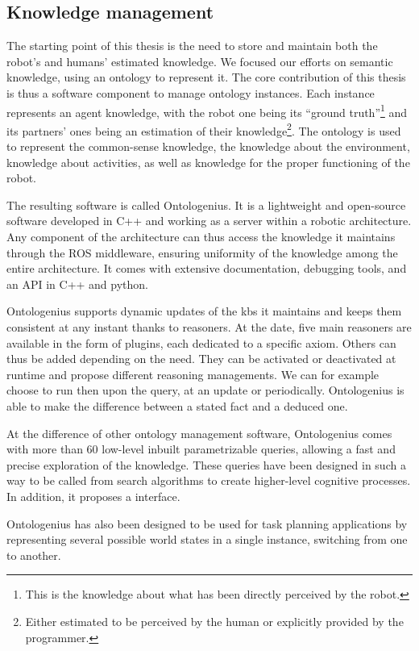 \subsection{Knowledge management}

The starting point of this thesis is the need to store and maintain both the robot's and humans' estimated knowledge. We focused our efforts on semantic knowledge, using an ontology to represent it. The core contribution of this thesis is thus a software component to manage ontology instances. Each instance represents an agent knowledge, with the robot one being its ``ground truth''\footnote{This is the knowledge about what has been directly perceived by the robot.} and its partners' ones being an estimation of their knowledge\footnote{Either estimated to be perceived by the human or explicitly provided by the programmer.}. The ontology is used to represent the common-sense knowledge, the knowledge about the environment, knowledge about activities, as well as knowledge for the proper functioning of the robot.

The resulting software is called Ontologenius. It is a lightweight and open-source software developed in C++ and working as a server within a robotic architecture. Any component of the architecture can thus access the knowledge it maintains through the ROS middleware, ensuring uniformity of the knowledge among the entire architecture. It comes with extensive documentation, debugging tools, and an API in C++ and python.

Ontologenius supports dynamic updates of the \acrlong{kb}s it maintains and keeps them consistent at any instant thanks to reasoners. At the date, five main reasoners are available in the form of plugins, each dedicated to a specific axiom. Others can thus be added depending on the need. They can be activated or deactivated at runtime and propose different reasoning managements. We can for example choose to run then upon the query, at an update or periodically. Ontologenius is able to make the difference between a stated fact and a deduced one.

At the difference of other ontology management software, Ontologenius comes with more than 60 low-level inbuilt parametrizable queries, allowing a fast and precise exploration of the knowledge. These queries have been designed in such a way to be called from search algorithms to create higher-level cognitive processes. In addition, it proposes a \sparql{} interface.

Ontologenius has also been designed to be used for task planning applications by representing several possible world states in a single instance, switching from one to another.

